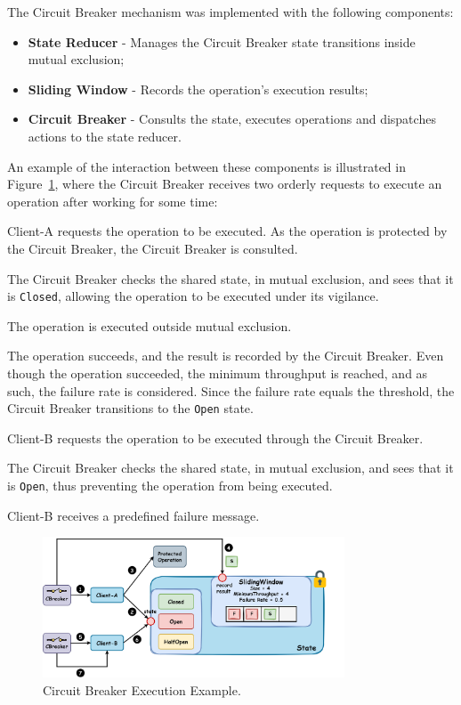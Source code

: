 The Circuit Breaker mechanism was implemented with the following components:

\begin{itemize}
    \item \textbf{State Reducer} - Manages the Circuit Breaker state transitions inside mutual exclusion;
    \item \textbf{Sliding Window} - Records the operation's execution results;
    \item \textbf{Circuit Breaker} - Consults the state, executes operations and dispatches actions to the state reducer.
\end{itemize}

An example of the interaction between these components is illustrated in Figure~\ref{fig:circuit-breaker-execution-example},
where the Circuit Breaker receives two orderly requests to execute an operation after working for some time:

\begin{boldenumerate}
    \item Client-A requests the operation to be executed.
    As the operation is protected by the Circuit Breaker, the Circuit Breaker is consulted.
    \item The Circuit Breaker checks the shared state, in mutual exclusion,
    and sees that it is \texttt{Closed}, allowing the operation to be executed under its vigilance.
    \item The operation is executed outside mutual exclusion.
    \item The operation succeeds, and the result is recorded by the Circuit Breaker.
    Even though the operation succeeded, the minimum throughput is reached,
    and as such, the failure rate is considered.
    Since the failure rate equals the threshold, the Circuit Breaker transitions to the \texttt{Open} state.
    \item Client-B requests the operation to be executed through the Circuit Breaker.
    \item The Circuit Breaker checks the shared state, in mutual exclusion, and sees that it is \texttt{Open}, thus preventing the operation from being executed.
    \item Client-B receives a predefined failure message.
\end{boldenumerate}

\begin{figure}[!htb]
    \centering
    \includegraphics[width=0.8\textwidth]{../figures/05_cbreaker-execution-example}
    \caption{Circuit Breaker Execution Example.}
    \label{fig:circuit-breaker-execution-example}
\end{figure}

